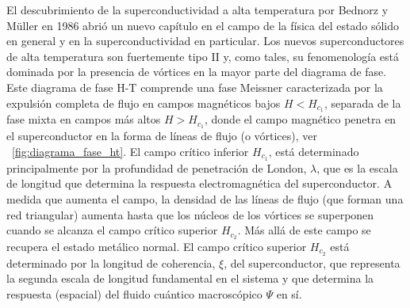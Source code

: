 \documentclass[a4paper,conference]{IEEEtran}
\begin{document}
El descubrimiento de la superconductividad a alta temperatura por Bednorz y
M\"{u}ller en 1986 abri\'{o} un nuevo cap\'{i}tulo en el campo de la f\'{i}sica
del estado s\'{o}lido en general y en la superconductividad en particular. 
Los nuevos superconductores de alta temperatura son fuertemente tipo II y, como
tales, su fenomenolog\'{i}a est\'{a} dominada por la presencia de v\'{o}rtices en la mayor
parte del diagrama de fase. 
Este diagrama de fase H-T comprende una fase Meissner caracterizada por la
expulsi\'{o}n completa de flujo en campos magn\'{e}ticos bajos $H < H_{c_1}$,
separada de la fase mixta en campos m\'{a}s altos $H > H_{c_1}$, donde el campo
magn\'{e}tico penetra en el superconductor en la forma de l\'{i}neas de flujo (o
v\'{o}rtices), ver \figurename~\ref{fig:diagrama_fase_ht}.
El campo cr\'{i}tico inferior $H_{c_1}$, est\'{a} determinado principalmente por la
profundidad de penetraci\'{o}n de London, $\lambda$, que es la escala de longitud
que determina la respuesta electromagn\'{e}tica del superconductor.  
A medida que
aumenta el campo, la densidad de las l\'{i}neas de flujo (que forman una red
triangular) aumenta hasta que los n\'{u}cleos de los v\'{o}rtices se superponen
cuando se alcanza el campo cr\'{i}tico superior $H_{c_2}$. M\'{a}s all\'{a} de este campo
se recupera el estado met\'{a}lico normal. El campo cr\'{i}tico superior $H_{c_2}$
est\'{a} determinado por la longitud de coherencia, $\xi$, del superconductor, que
representa la segunda escala de longitud fundamental en el sistema y que
determina la respuesta (espacial) del fluido cu\'{a}ntico macrosc\'{o}pico
$\Psi$ en s\'{i}.

\end{document}

